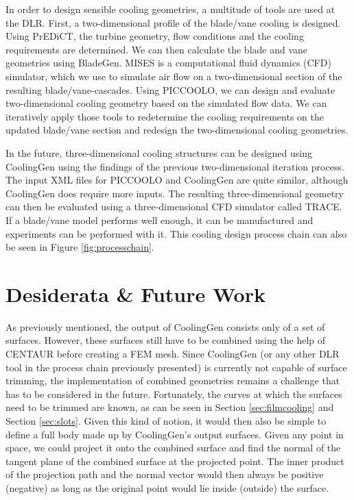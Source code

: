 \documentclass[a4paper, 11pt]{report}
\theoremstyle{definition}
\begin{document}
		In order to design sensible cooling geometries, a multitude of tools are used at the DLR. First, a two-dimensional profile of the blade/vane cooling is designed. Using PrEDiCT, the turbine geometry, flow conditions and the cooling requirements are determined. We can then calculate the blade and vane geometries using BladeGen. MISES is a computational fluid dynamics (CFD) simulator, which we use to simulate air flow on a two-dimensional section of the resulting blade/vane-cascades. Using PICCOOLO, we can design and evaluate two-dimensional cooling geometry based on the simulated flow data. We can iteratively apply those tools to redetermine the cooling requirements on the updated blade/vane section and redesign the two-dimensional cooling geometries.

		In the future, three-dimensional cooling structures can be designed using CoolingGen using the findings of the previous two-dimensional iteration process. The input XML files for PICCOOLO and CoolingGen are quite similar, although CoolingGen does require more inputs. The resulting three-dimensional geometry can then be evaluated using a three-dimensional CFD simulator called TRACE. If a blade/vane model performs well enough, it can be manufactured and experiments can be performed with it. This cooling design process chain can also be seen in Figure \ref{fig:processchain}.

	\section{Desiderata \& Future Work}
		As previously mentioned, the output of CoolingGen consists only of a set of surfaces. However, these surfaces still have to be combined using the help of CENTAUR before creating a FEM mesh. Since CoolingGen (or any other DLR tool in the process chain previously presented) is currently not capable of surface trimming, the implementation of combined geometries remains a challenge that has to be considered in the future. Fortunately, the curves at which the surfaces need to be trimmed are known, as can be seen in Section \ref{sec:filmcooling} and Section \ref{sec:slots}. Given this kind of notion, it would then also be simple to define a full body made up by CoolingGen's output surfaces. Given any point in space, we could project it onto the combined surface and find the normal of the tangent plane of the combined surface at the projected point. The inner product of the projection path and the normal vector would then always be positive (negative) as long as the original point would lie inside (outside) the surface.
\end{document}
